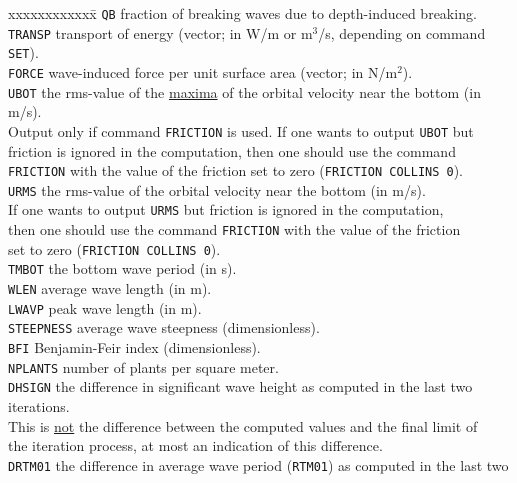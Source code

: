 \documentclass[12pt]{book}
\begin{document}
\begin{tabbing}
 xxxxxxxxxxxx\= \kill
{\tt QB}     \> fraction of breaking waves due to depth-induced breaking.\\
{\tt TRANSP} \> transport of energy (vector; in W/m or m$^3$/s, depending on command {\tt SET}).\\
{\tt FORCE}  \> wave-induced force per unit surface area (vector; in N/m$^2$).\\
{\tt UBOT}   \> the rms-value of the \underline{maxima} of the orbital velocity near the bottom (in m/s).\+\\
                Output only if command {\tt FRICTION} is used. If one wants to output {\tt UBOT} but\\
                friction is ignored in the computation, then one should use the command\\
                {\tt FRICTION} with the value of the friction set to zero ({\tt FRICTION COLLINS 0}).\-\\
{\tt URMS}   \> the rms-value of the orbital velocity near the bottom (in m/s).\+\\
                If one wants to output {\tt URMS} but friction is ignored in the computation,\\
                then one should use the command {\tt FRICTION} with the value of the friction\\
                set to zero ({\tt FRICTION COLLINS 0}).\-\\
{\tt TMBOT}  \> the bottom wave period (in s).\\
{\tt WLEN}   \> average wave length (in m).\\
{\tt LWAVP}  \> peak wave length (in m).\\
{\tt STEEPNESS} \> average wave steepness (dimensionless).\\
{\tt BFI}    \> Benjamin-Feir index (dimensionless).\\
{\tt NPLANTS} \> number of plants per square meter.\\
{\tt DHSIGN} \> the difference in significant wave height as computed in the last two iterations.\+\\
                This is \underline{not} the difference between the computed values and the final limit of\\
                the iteration process, at most an indication of this difference.\-\\
{\tt DRTM01} \> the difference in average wave period ({\tt RTM01}) as computed in the last two\+\\

\end{tabbing}
\end{document}
